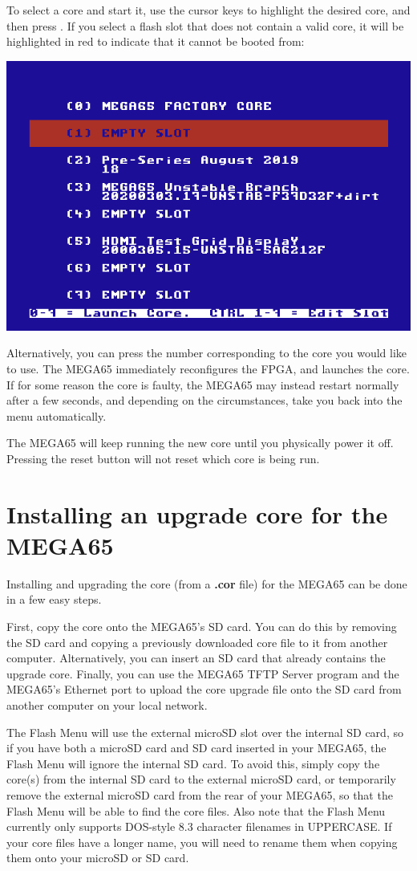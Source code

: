To select a core and start it, use the cursor keys to highlight the desired core, and then press
.  If you select a flash slot that does not
contain a valid core, it will be highlighted in red to indicate that it
cannot be booted from:

\begin{center}
\includegraphics[trim= 0  0 0 10mm,clip,width=0.7\linewidth]{images/ss-flashmenu-invalidslot.png}
\end{center}

Alternatively, you can press the number corresponding to the core you would
like to use. The MEGA65 immediately reconfigures the FPGA, and launches the core.  If for some reason
the core is faulty, the MEGA65 may instead restart normally after a few seconds, and depending on the
circumstances, take you back into the menu automatically.

The MEGA65 will keep running the new core until you physically power it off.  Pressing the reset button
will not reset which core is being run.

\section{Installing an upgrade core for the MEGA65}

Installing and upgrading the core (from a {\bf .cor} file) for the MEGA65 can be done in a few easy steps.

First, copy the core onto the MEGA65's SD card. You can do this by removing the SD card and copying a previously
downloaded core file to it from another computer. Alternatively,
you can insert an SD card that already contains the upgrade core. Finally, you can use the MEGA65 TFTP Server
program and the MEGA65's Ethernet port to upload the core upgrade file onto the SD card from another computer
on your local network.

The Flash Menu will use the external microSD slot over
the internal SD card, so if you have both a microSD card and SD card
inserted in your MEGA65, the Flash Menu will ignore the
internal SD card. To avoid this, simply copy the core(s) from the internal SD
card to the external microSD card, or temporarily remove the external
microSD card from the rear of your MEGA65, so that the Flash Menu will
be able to find the core files.  Also note that the Flash Menu
currently only supports DOS-style 8.3 character filenames in UPPERCASE. If your
core files have a longer name, you will need to rename them when
copying them onto your microSD or SD card.

